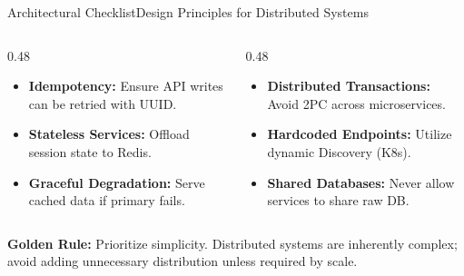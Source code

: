 \documentclass[aspectratio=169, 10pt]{beamer}
\begin{document}
\begin{frame}{Architectural Checklist}{Design Principles for Distributed Systems}
  \vspace*{-0.3cm}
  \begin{columns}[T]
    \begin{column}{0.48\textwidth}
      \begin{tcolorbox}[nordiccard, title={\color{NordicBlue}\faCheckSquare\ \,System Design Musts}]
        \begin{itemize}
          \item \textbf{Idempotency:} Ensure API writes can be retried with UUID.
          \item \textbf{Stateless Services:} Offload session state to Redis.
          \item \textbf{Graceful Degradation:} Serve cached data if primary fails.
        \end{itemize}
      \end{tcolorbox}
    \end{column}

    \begin{column}{0.48\textwidth}
      \begin{tcolorbox}[nordiccard, title={\color{NordicTeal}\faExclamationCircle\ \,Operational Anti-Patterns}]
        \begin{itemize}
          \item \textbf{Distributed Transactions:} Avoid 2PC across microservices.
          \item \textbf{Hardcoded Endpoints:} Utilize dynamic Discovery (K8s).
          \item \textbf{Shared Databases:} Never allow services to share raw DB.
        \end{itemize}
      \end{tcolorbox}
    \end{column}
  \end{columns}

  \vspace*{0.1cm}
  \begin{tcolorbox}[nordictealbox]
    {\color{NordicDark}\bfseries Golden Rule:} Prioritize simplicity. Distributed systems are inherently complex; avoid adding unnecessary distribution unless required by scale.
  \end{tcolorbox}
\end{frame}
\end{document}

